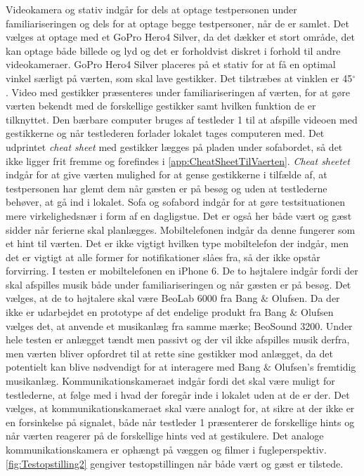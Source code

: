 Videokamera og stativ indgår for dels at optage testpersonen under familiariseringen og dels for at optage begge testpersoner, når de er samlet. Det vælges at optage med et GoPro Hero4 Silver, da det dækker et stort område, det kan optage både billede og lyd og det er forholdvist diskret i forhold til andre videokameraer. GoPro Hero4 Silver placeres på et stativ for at få en optimal vinkel særligt på værten, som skal lave gestikker. Det tilstræbes at vinklen er 45$^{\circ}$ . Video med gestikker præsenteres under familiariseringen af værten, for at gøre værten bekendt med de forskellige gestikker samt hvilken funktion de er tilknyttet. Den bærbare computer bruges af testleder 1 til at afspille videoen med gestikkerne og når testlederen forlader lokalet tages computeren med. Det udprintet \textit{cheat sheet} med gestikker lægges på pladen under sofabordet, så det ikke ligger frit fremme og forefindes i \autoref{app:CheatSheetTilVaerten}. \textit{Cheat sheetet} indgår for at give værten mulighed for at gense gestikkerne i tilfælde af, at testpersonen har glemt dem når gæsten er på besøg og uden at testlederne behøver, at gå ind i lokalet. Sofa og sofabord indgår for at gøre testsituationen mere virkelighedsnær i form af en dagligstue. Det er også her både vært og gæst sidder når ferierne skal planlægges. Mobiltelefonen indgår da denne fungerer som et hint til værten. Det er ikke vigtigt hvilken type mobiltelefon der indgår, men det er vigtigt at alle former for notifikationer slåes fra, så der ikke opstår forvirring. I testen er mobiltelefonen en iPhone 6. De to højtalere indgår fordi der skal afspilles musik både under familiariseringen og når gæsten er på besøg. Det vælges, at de to højtalere skal være BeoLab 6000 fra Bang $\&$ Olufsen. Da der ikke er udarbejdet en prototype af det endelige produkt fra Bang $\&$ Olufsen vælges det, at anvende et musikanlæg fra samme mærke; BeoSound 3200. Under hele testen er anlægget tændt men passivt og der vil ikke afspilles musik derfra, men værten bliver opfordret til at rette sine gestikker mod anlægget, da det potentielt kan blive nødvendigt for at interagere med Bang $\&$ Olufsen's fremtidig musikanlæg. Kommunikationskameraet indgår fordi det skal være muligt for testlederne, at følge med i hvad der foregår inde i lokalet uden at de er der. Det vælges, at kommunikationskameraet skal være analogt for, at sikre at der ikke er en forsinkelse på signalet, både når testleder 1 præsenterer de forskellige hints og når værten reagerer på de forskellige hints ved at gestikulere. Det analoge kommunikationskamera er ophængt på væggen og filmer i fugleperspektiv. \autoref{fig:Testopstilling2} gengiver testopstillingen når både vært og gæst er tilstede. 
